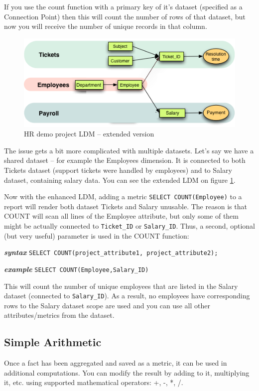\documentclass[a4paper, 12pt, titlepage, fleqn]{article}
\begin{document}
If you use the count function with a primary key of it's dataset (specified as a Connection Point) then this will count the number of rows of that dataset, but now you will receive the number of unique records in that column.

\begin{figure}[htb]
\centering
\includegraphics[scale=0.6]{images/hr_extend.png}
\caption{HR demo project LDM -- extended version}
\label{fig:hrldme}
\end{figure}

The issue gets a bit more complicated with multiple datasets. Let's say we have a shared dataset -- for example the Employees dimension. It is connected to both Tickets dataset (support tickets were handled by employees) and to Salary dataset, containing salary data. You can see the extended LDM on figure \ref{fig:hrldme}.

Now with the enhanced LDM, adding a metric \verb=SELECT COUNT(Employee)= to a report will render both dataset Tickets and Salary unusable. The reason is that COUNT will scan all lines of the Employee attribute, but only some of them might be actually connected to \verb=Ticket_ID= or \verb=Salary_ID=. Thus, a second, optional (but very useful) parameter is used in the COUNT function:

\textbf{\emph{syntax}}  \hspace{.9cm}\verb=SELECT COUNT(project_attribute1, project_attribute2);=

\textbf{\emph{example}}  \hspace{.5cm}\verb=SELECT COUNT(Employee,Salary_ID)=

This will count the number of unique employees that are listed in the Salary dataset (connected to \verb=Salary_ID=). As a result, no employees have corresponding rows to the Salary dataset scope are used and you can use all other attributes/metrics from the dataset.

\subsection{Simple Arithmetic}
Once a fact has been aggregated and saved as a metric, it can be used in additional computations. You can modify the result by adding to it, multiplying it, etc. using supported mathematical operators: +, -, *, /.
\end{document}
